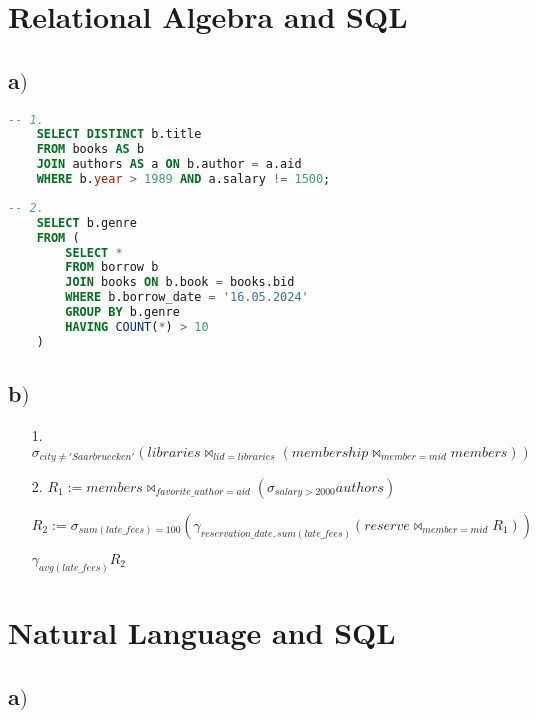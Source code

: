 



\section{ Relational Algebra and SQL}	

\subsection{a$)$}

\begin{lstlisting}[language=SQL]
	-- 1.
	SELECT DISTINCT b.title
	FROM books AS b
	JOIN authors AS a ON b.author = a.aid
	WHERE b.year > 1989 AND a.salary != 1500;
\end{lstlisting}

\begin{lstlisting}[language=SQL]
	-- 2.
	SELECT b.genre
	FROM (
		SELECT *
		FROM borrow b
		JOIN books ON b.book = books.bid
		WHERE b.borrow_date = '16.05.2024'
		GROUP BY b.genre
		HAVING COUNT(*) > 10
	)
\end{lstlisting}

\subsection{b$)$}

\begin{itemize}
	\item[1.] ${\sigma_{city \neq 'Saarbruecken'}(libraries {\Join}_{lid = libraries} (membership {\Join}_{member = mid} members))}$
	\item[2.] $R_1 := members {\Join}_{favorite\_author=aid} ({\sigma}_{salary > 2000} authors)$
	
			  $R_2 := {\sigma}_{sum(late\_fees) = 100} ({\gamma}_{reservation\_date, sum(late\_fees)} (reserve {\Join}_{member = mid} R_1))$
			  
			  ${\gamma}_{avg(late\_fees)} R_2$
		
\end{itemize}
	
\section{Natural Language and SQL}	

\subsection{a$)$}

